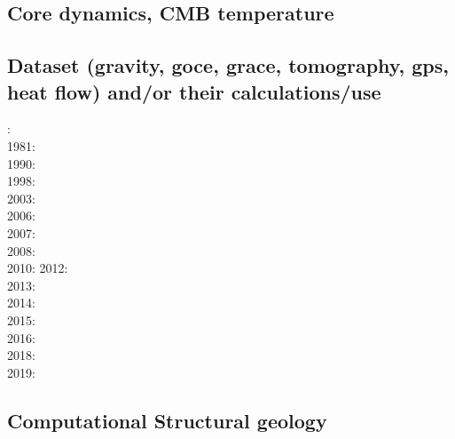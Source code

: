 \subsection*{Core dynamics, CMB temperature}
 

\noindent
\cite{hayu96}
\cite{nata04c}
\cite{lahb08}\cite{gost08}\cite{sata08}
\cite{kisn09}
\cite{nata10}\cite{lamg10}
\cite{cobu12}
\cite{nata13}
\cite{yiym19}

\subsection*{Dataset (gravity, goce, grace, tomography, gps, heat flow) 
and/or their calculations/use}
    

: \cite{rola77}\\
1981: \cite{dzan81}\\
1990: \cite{lips90}\\
1998: \cite{bisp98}\\
2003: \cite{krhh03}\cite{sosi03}\cite{pimo03}\\
2006: \cite{masr06}\\
2007: \cite{mitk07}\cite{lobc07}\cite{rimb07}\\
2008: \cite{zhou08}\cite{zhou08}\\
2010: \cite{dada10}
2012: \cite{hawj12}\cite{resa12}\cite{hawj12}\cite{fesw12}\\
2013: \cite{ress13}\cite{ebbf13}\cite{davi13}\\
2014: \cite{paml14}\cite{ebbf14}\cite{krbk14}\\
2015: \cite{boem15}\cite{brrs15}\\
2016: \cite{kord16}\cite{moek16}\\
2018: \cite{pabn18}\cite{hamp18}\\
2019: \cite{sopg19}

\subsection*{Computational Structural geology}

